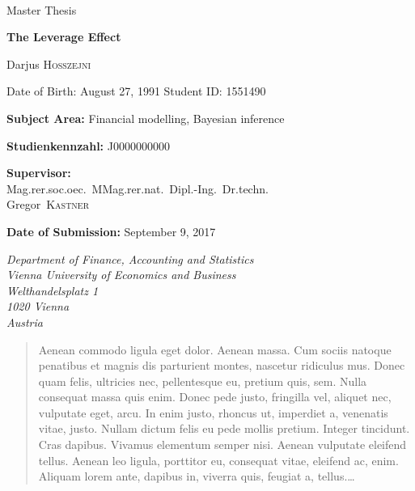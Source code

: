 \documentclass[a4paper, 12pt, twppages]{article}
\newcommand\BackgroundPic{%
\put(0,0){%
\parbox[b][\paperheight]{\paperwidth}{%
\vfill
\centering
\texttt{[image: background.pdf]}%
\vfill
}}}
\begin{document}

\pagebreak

\AddToShipoutPicture*{\BackgroundPic}
\thispagestyle{fancy}


{\vspace{2cm}~}
{\vspace{2cm}}

{\noindent\large Master Thesis}


\vspace{1cm}

{\noindent\huge\textbf{The Leverage Effect}}

\bigskip

{\noindent\LARGE Darjus \textsc{Hosszejni}}

\bigskip
{\noindent\small Date of Birth: August 27, 1991}\newline
{\noindent\small Student ID: 1551490}

\bigskip
{\vspace{2cm}}
{\noindent\large {\bf Subject Area:} Financial modelling, Bayesian inference}

\bigskip
{\noindent\large {\bf Studienkennzahl:} J0000000000}

\bigskip


{\noindent\large {\bf Supervisor:}\\ Mag.rer.soc.oec.~MMag.rer.nat.~Dipl.-Ing.~Dr.techn.\\
Gregor~\textsc{Kastner}}

\bigskip

{\noindent\large {\bf Date of Submission:} September 9, 2017}

\bigskip\bigskip\bigskip\bigskip\bigskip\bigskip

{\em\noindent Department of Finance, Accounting and Statistics\\
Vienna University of Economics and Business\\
Welthandelsplatz 1\\
1020 Vienna\\
Austria
}


\pagestyle{empty}
\pagebreak
\tableofcontents
\pagebreak
\listoffigures
\pagebreak
\listoftables
\pagebreak


\begin{abstract}
Aenean commodo ligula eget dolor. Aenean massa. Cum sociis natoque penatibus et magnis dis parturient montes, nascetur ridiculus mus. Donec quam felis, ultricies nec, pellentesque eu, pretium quis, sem. Nulla consequat massa quis enim. Donec pede justo, fringilla vel, aliquet nec, vulputate eget, arcu. In enim justo, rhoncus ut, imperdiet a, venenatis vitae, justo. Nullam dictum felis eu pede mollis pretium. Integer tincidunt. Cras dapibus. Vivamus elementum semper nisi. Aenean vulputate eleifend tellus. Aenean leo ligula, porttitor eu, consequat vitae, eleifend ac, enim. Aliquam lorem ante, dapibus in, viverra quis, feugiat a, tellus.\dots
\end{abstract}

\pagebreak







\nocite{*}


\end{document}
